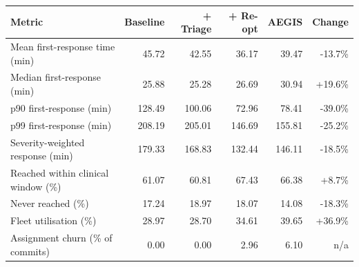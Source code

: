 \begin{tabular}{@{}lrrrrr@{}}
\toprule
Metric & Baseline & + Triage & + Re-opt & AEGIS & \textbf{Change} \\
\midrule
Mean first-response time (min) & 45.72 & 42.55 & 36.17 & 39.47 & \textcolor{good}{-13.7\%} \\
Median first-response (min) & 25.88 & 25.28 & 26.69 & 30.94 & \textcolor{bad}{+19.6\%} \\
p90 first-response (min) & 128.49 & 100.06 & 72.96 & 78.41 & \textcolor{good}{-39.0\%} \\
p99 first-response (min) & 208.19 & 205.01 & 146.69 & 155.81 & \textcolor{good}{-25.2\%} \\
Severity-weighted response (min) & 179.33 & 168.83 & 132.44 & 146.11 & \textcolor{good}{-18.5\%} \\
Reached within clinical window (\%) & 61.07 & 60.81 & 67.43 & 66.38 & \textcolor{good}{+8.7\%} \\
Never reached (\%) & 17.24 & 18.97 & 18.07 & 14.08 & \textcolor{good}{-18.3\%} \\
Fleet utilisation (\%) & 28.97 & 28.70 & 34.61 & 39.65 & \textcolor{good}{+36.9\%} \\
Assignment churn (\% of commits) & 0.00 & 0.00 & 2.96 & 6.10 & \textcolor{muted}{n/a} \\
\bottomrule
\end{tabular}